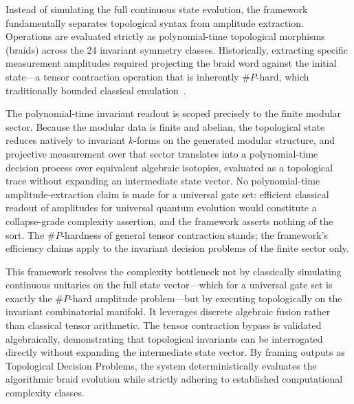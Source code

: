 Instead of simulating the full continuous state evolution, the framework fundamentally separates topological syntax from amplitude extraction. Operations are evaluated strictly as polynomial-time topological morphisms (braids) across the 24 invariant symmetry classes. Historically, extracting specific measurement amplitudes required projecting the braid word against the initial state---a tensor contraction operation that is inherently $\#P$-hard, which traditionally bounded classical emulation~\cite{bernstein1997}. 

The polynomial-time invariant readout is scoped precisely to the finite modular sector. Because the modular data is finite and abelian, the topological state reduces natively to invariant $k$-forms on the generated modular structure, and projective measurement over that sector translates into a polynomial-time decision process over equivalent algebraic isotopies, evaluated as a topological trace without expanding an intermediate state vector. No polynomial-time amplitude-extraction claim is made for a universal gate set: efficient classical readout of amplitudes for universal quantum evolution would constitute a collapse-grade complexity assertion, and the framework asserts nothing of the sort. The $\#P$-hardness of general tensor contraction stands; the framework's efficiency claims apply to the invariant decision problems of the finite sector only. 

This framework resolves the complexity bottleneck not by classically simulating continuous unitaries on the full state vector---which for a universal gate set is exactly the $\#P$-hard amplitude problem---but by executing topologically on the invariant combinatorial manifold. It leverages discrete algebraic fusion rather than classical tensor arithmetic. The tensor contraction bypass is validated algebraically, demonstrating that topological invariants can be interrogated directly without expanding the intermediate state vector. By framing outputs as Topological Decision Problems, the system deterministically evaluates the algorithmic braid evolution while strictly adhering to established computational complexity classes.
